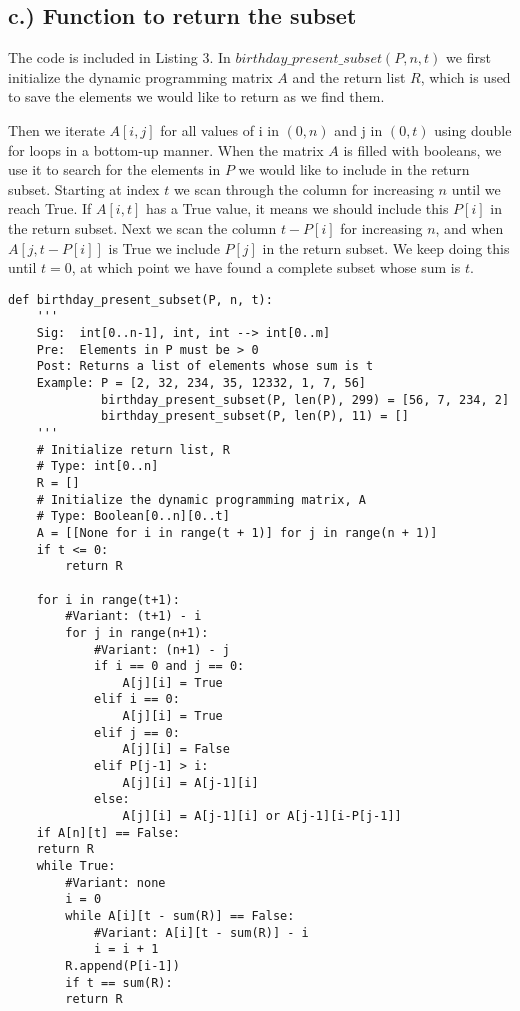 \documentclass{article}
\begin{document}
\subsection*{c.) Function to return the subset }
The code is included in Listing 3. In $birthday\_present\_subset(P,n,t)$ we first initialize the dynamic programming matrix $A$ and the return list $R$, which is used to save the elements we would like to return as we find them. 

Then we iterate $A[i,j]$ for all values of i in $(0,n)$ and j in $(0,t)$ using double for loops in a bottom-up manner. When the matrix $A$ is filled with booleans, we use it to search for the elements in $P$ we would like to include in the return subset. Starting at index $t$ we scan through the column for increasing $n$ until we reach True. If $A[i,t]$ has a True value, it means we should include this $P[i]$ in the return subset. Next we scan the column $t-P[i]$ for increasing $n$, and when $A[j,t-P[i]]$ is True we include $P[j]$ in the return subset. We keep doing this until $t=0$, at which point we have found a complete subset whose sum is $t$.
\newpage
{}
\begin{lstlisting}[caption={Code for Birthday Present Subset},captionpos=b]
def birthday_present_subset(P, n, t):
    '''
    Sig:  int[0..n-1], int, int --> int[0..m]
    Pre:  Elements in P must be > 0
    Post: Returns a list of elements whose sum is t 
    Example: P = [2, 32, 234, 35, 12332, 1, 7, 56]
             birthday_present_subset(P, len(P), 299) = [56, 7, 234, 2]
             birthday_present_subset(P, len(P), 11) = []
    '''
    # Initialize return list, R
    # Type: int[0..n]
    R = []
    # Initialize the dynamic programming matrix, A
    # Type: Boolean[0..n][0..t]
    A = [[None for i in range(t + 1)] for j in range(n + 1)]
    if t <= 0:
        return R
    
    for i in range(t+1):
        #Variant: (t+1) - i
        for j in range(n+1):
            #Variant: (n+1) - j
            if i == 0 and j == 0:
                A[j][i] = True
            elif i == 0:
                A[j][i] = True
            elif j == 0:
                A[j][i] = False
            elif P[j-1] > i:
                A[j][i] = A[j-1][i]
            else:
                A[j][i] = A[j-1][i] or A[j-1][i-P[j-1]]
    if A[n][t] == False:
	return R
    while True:
        #Variant: none
        i = 0
        while A[i][t - sum(R)] == False:
            #Variant: A[i][t - sum(R)] - i
            i = i + 1
        R.append(P[i-1])
        if t == sum(R):
	    return R
\end{lstlisting}
\end{document}
